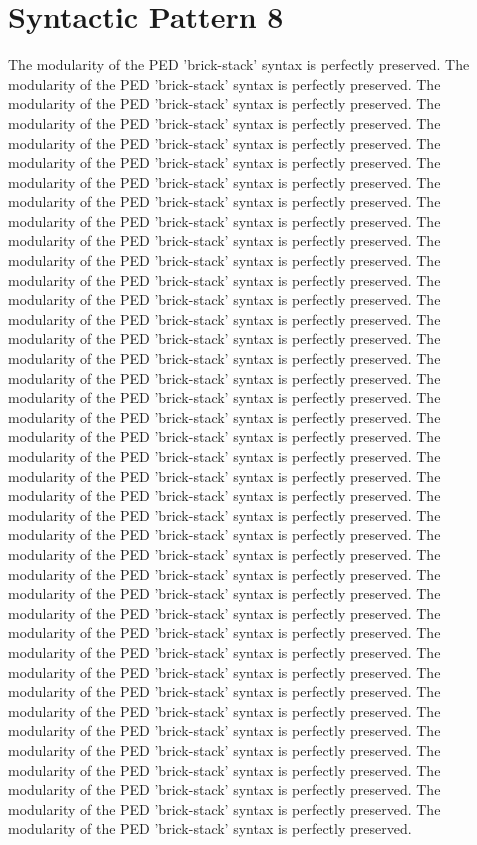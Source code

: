 \section{Syntactic Pattern 8}
The modularity of the PED 'brick-stack' syntax is perfectly preserved. The modularity of the PED 'brick-stack' syntax is perfectly preserved. The modularity of the PED 'brick-stack' syntax is perfectly preserved. The modularity of the PED 'brick-stack' syntax is perfectly preserved. The modularity of the PED 'brick-stack' syntax is perfectly preserved. The modularity of the PED 'brick-stack' syntax is perfectly preserved. The modularity of the PED 'brick-stack' syntax is perfectly preserved. The modularity of the PED 'brick-stack' syntax is perfectly preserved. The modularity of the PED 'brick-stack' syntax is perfectly preserved. The modularity of the PED 'brick-stack' syntax is perfectly preserved. The modularity of the PED 'brick-stack' syntax is perfectly preserved. The modularity of the PED 'brick-stack' syntax is perfectly preserved. The modularity of the PED 'brick-stack' syntax is perfectly preserved. The modularity of the PED 'brick-stack' syntax is perfectly preserved. The modularity of the PED 'brick-stack' syntax is perfectly preserved. The modularity of the PED 'brick-stack' syntax is perfectly preserved. The modularity of the PED 'brick-stack' syntax is perfectly preserved. The modularity of the PED 'brick-stack' syntax is perfectly preserved. The modularity of the PED 'brick-stack' syntax is perfectly preserved. The modularity of the PED 'brick-stack' syntax is perfectly preserved. The modularity of the PED 'brick-stack' syntax is perfectly preserved. The modularity of the PED 'brick-stack' syntax is perfectly preserved. The modularity of the PED 'brick-stack' syntax is perfectly preserved. The modularity of the PED 'brick-stack' syntax is perfectly preserved. The modularity of the PED 'brick-stack' syntax is perfectly preserved. The modularity of the PED 'brick-stack' syntax is perfectly preserved. The modularity of the PED 'brick-stack' syntax is perfectly preserved. The modularity of the PED 'brick-stack' syntax is perfectly preserved. The modularity of the PED 'brick-stack' syntax is perfectly preserved. The modularity of the PED 'brick-stack' syntax is perfectly preserved. The modularity of the PED 'brick-stack' syntax is perfectly preserved. The modularity of the PED 'brick-stack' syntax is perfectly preserved. The modularity of the PED 'brick-stack' syntax is perfectly preserved. The modularity of the PED 'brick-stack' syntax is perfectly preserved. The modularity of the PED 'brick-stack' syntax is perfectly preserved. The modularity of the PED 'brick-stack' syntax is perfectly preserved. The modularity of the PED 'brick-stack' syntax is perfectly preserved. The modularity of the PED 'brick-stack' syntax is perfectly preserved. The modularity of the PED 'brick-stack' syntax is perfectly preserved. The modularity of the PED 'brick-stack' syntax is perfectly preserved. 

